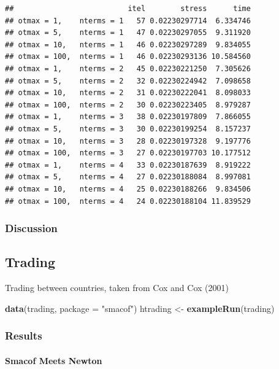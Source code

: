 \documentclass[
  12pt,
]{article}
\newenvironment{Shaded}{\begin{snugshade}}{\end{snugshade}}
\newcommand{\AttributeTok}[1]{\textcolor[rgb]{0.13,0.29,0.53}{#1}}
\newcommand{\FunctionTok}[1]{\textcolor[rgb]{0.13,0.29,0.53}{\textbf{#1}}}
\newcommand{\NormalTok}[1]{#1}
\newcommand{\OtherTok}[1]{\textcolor[rgb]{0.56,0.35,0.01}{#1}}
\newcommand{\StringTok}[1]{\textcolor[rgb]{0.31,0.60,0.02}{#1}}
\begin{document}
\begin{verbatim}
##                          itel        stress      time
## otmax = 1,    nterms = 1   57 0.02230297714  6.334746
## otmax = 5,    nterms = 1   47 0.02230297055  9.311920
## otmax = 10,   nterms = 1   46 0.02230297289  9.834055
## otmax = 100,  nterms = 1   46 0.02230293136 10.584560
## otmax = 1,    nterms = 2   45 0.02230221250  7.305626
## otmax = 5,    nterms = 2   32 0.02230224942  7.098658
## otmax = 10,   nterms = 2   31 0.02230222041  8.098033
## otmax = 100,  nterms = 2   30 0.02230223405  8.979287
## otmax = 1,    nterms = 3   38 0.02230197809  7.866055
## otmax = 5,    nterms = 3   30 0.02230199254  8.157237
## otmax = 10,   nterms = 3   28 0.02230197328  9.197776
## otmax = 100,  nterms = 3   27 0.02230197703 10.177512
## otmax = 1,    nterms = 4   33 0.02230187639  8.919222
## otmax = 5,    nterms = 4   27 0.02230188084  8.997081
## otmax = 10,   nterms = 4   25 0.02230188266  9.834506
## otmax = 100,  nterms = 4   24 0.02230188104 11.839529
\end{verbatim}

\subsubsection{Discussion}\label{discussion-3}

\subsection{Trading}\label{trading}

Trading between countries, taken from Cox and Cox (2001)

\begin{Shaded}
\begin{Highlighting}[]
\FunctionTok{data}\NormalTok{(trading, }\AttributeTok{package =} \StringTok{"smacof"}\NormalTok{)}
\NormalTok{htrading }\OtherTok{\textless{}{-}} \FunctionTok{exampleRun}\NormalTok{(trading)}
\end{Highlighting}
\end{Shaded}

\subsubsection{Results}\label{results-5}

\paragraph{Smacof Meets Newton}\label{smacof-meets-newton-5}
\end{document}
